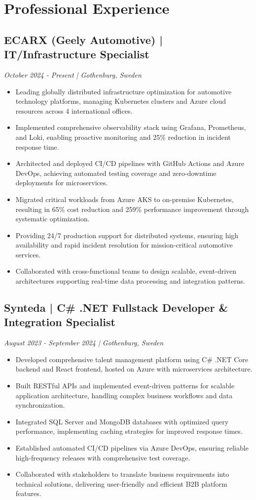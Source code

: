 \documentclass[10pt,a4paper]{article}
\begin{document}
\section*{Professional Experience}

\subsection*{ECARX (Geely Automotive) | IT/Infrastructure Specialist}
\textit{October 2024 - Present | Gothenburg, Sweden}
\begin{itemize}[noitemsep]
\item Leading globally distributed infrastructure optimization for automotive technology platforms, managing Kubernetes clusters and Azure cloud resources across 4 international offices.
\item Implemented comprehensive observability stack using Grafana, Prometheus, and Loki, enabling proactive monitoring and 25\% reduction in incident response time.
\item Architected and deployed CI/CD pipelines with GitHub Actions and Azure DevOps, achieving automated testing coverage and zero-downtime deployments for microservices.
\item Migrated critical workloads from Azure AKS to on-premise Kubernetes, resulting in 65\% cost reduction and 259\% performance improvement through systematic optimization.
\item Providing 24/7 production support for distributed systems, ensuring high availability and rapid incident resolution for mission-critical automotive services.
\item Collaborated with cross-functional teams to design scalable, event-driven architectures supporting real-time data processing and integration patterns.
\end{itemize}

\subsection*{Synteda | C\# .NET Fullstack Developer \& Integration Specialist}
\textit{August 2023 - September 2024 | Gothenburg, Sweden}
\begin{itemize}[noitemsep]
\item Developed comprehensive talent management platform using C\# .NET Core backend and React frontend, hosted on Azure with microservices architecture.
\item Built RESTful APIs and implemented event-driven patterns for scalable application architecture, handling complex business workflows and data synchronization.
\item Integrated SQL Server and MongoDB databases with optimized query performance, implementing caching strategies for improved response times.
\item Established automated CI/CD pipelines via Azure DevOps, ensuring reliable high-frequency releases with comprehensive test coverage.
\item Collaborated with stakeholders to translate business requirements into technical solutions, delivering user-friendly and efficient B2B platform features.
\end{itemize}
\end{document}

